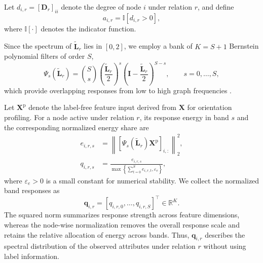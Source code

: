 \documentclass[10pt,journal]{IEEEtran}
\begin{document}
Let
$d_{i,r}=[\mathbf{D}_r]_{ii}$
denote the degree of node $i$ under relation $r$, and define
\begin{equation}
a_{i,r}
=
\mathbb{I}[d_{i,r}>0],
\label{eq:active}
\end{equation}
where $\mathbb{I}[\cdot]$ denotes the indicator function.

Since the spectrum of $\widetilde{\mathbf{L}}_r$ lies in $[0,2]$, we employ
a bank of $K=S+1$ Bernstein polynomial filters of order $S$,
\begin{equation}
\Psi_s(\widetilde{\mathbf{L}}_r)
=
\binom{S}{s}
\left(\frac{\widetilde{\mathbf{L}}_r}{2}\right)^s
\left(
\mathbf{I}
-
\frac{\widetilde{\mathbf{L}}_r}{2}
\right)^{S-s},
\qquad
s=0,\ldots,S,
\label{eq:bernstein}
\end{equation}
which provide overlapping responses from low to high graph frequencies
\cite{shuman2013emerging,tang2022bwgnn}.

Let $\mathbf{X}^{\mathrm p}$ denote the label-free feature input derived from
$\mathbf{X}$ for orientation profiling. For a node active under relation $r$,
its response energy in band $s$ and the corresponding normalized energy share
are
\begin{equation}
\begin{aligned}
e_{i,r,s}
&=
\left\|
\left[
\Psi_s(\widetilde{\mathbf{L}}_r)
\mathbf{X}^{\mathrm p}
\right]_{i,:}
\right\|_2^2,\\
q_{i,r,s}
&=
\frac{e_{i,r,s}}
{\max\left\{
\sum_{t=0}^{S}e_{i,r,t},
\varepsilon_e
\right\}},
\end{aligned}
\label{eq:profile}
\end{equation}
where $\varepsilon_e>0$ is a small constant for numerical stability.
We collect the normalized band responses as
\begin{equation}
\mathbf{q}_{i,r}
=
[q_{i,r,0},\ldots,q_{i,r,S}]^\top
\in\mathbb{R}^{K}.
\label{eq:profile_vector}
\end{equation}
The squared norm summarizes response strength across feature dimensions,
whereas the node-wise normalization removes the overall response scale and
retains the relative allocation of energy across bands. Thus,
$\mathbf{q}_{i,r}$ describes the spectral distribution of the observed
attributes under relation $r$ without using label information.
\end{document}
